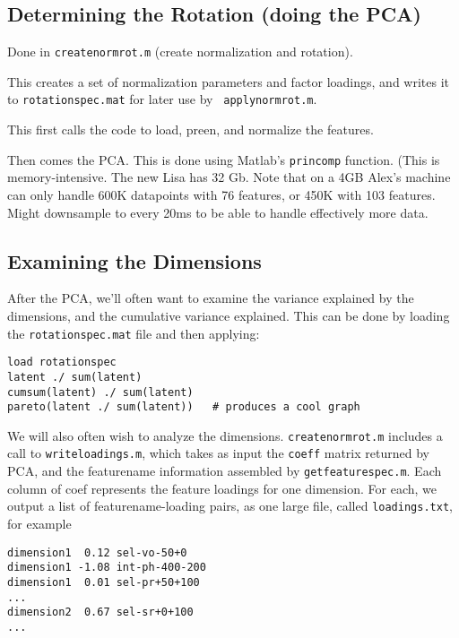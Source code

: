 \documentclass[11pt]{article}
\begin{document}
\subsection{Determining the Rotation (doing the PCA)}   \label{rotating}

Done in {\tt createnormrot.m} (create normalization and rotation).

This creates a set of normalization parameters and factor loadings,
and writes it to {\tt rotationspec.mat} for later use by {\tt
  applynormrot.m}.

This first calls the code to load, preen, and normalize the features.

Then comes the PCA.  This is done using Matlab's {\tt princomp}
function.  (This is memory-intensive.  The new Lisa has 32 Gb.  Note
that on a 4GB Alex's machine can only handle 600K datapoints with 76
features, or 450K with 103 features.  Might downsample to every 20ms
to be able to handle effectively more data.

\subsection{Examining the Dimensions}

After the PCA, we'll often want to examine the variance explained by
the dimensions, and the cumulative variance explained.  This can be
done by loading the {\tt rotationspec.mat} file and then applying:

\begin{verbatim}
load rotationspec
latent ./ sum(latent) 
cumsum(latent) ./ sum(latent) 
pareto(latent ./ sum(latent))   # produces a cool graph
\end{verbatim}


We will also often wish to analyze the dimensions.  
{\tt createnormrot.m} includes a call to  {\tt writeloadings.m}, which
takes as input the {\tt coeff} matrix returned by PCA, and the
featurename information assembled by {\tt getfeaturespec.m}.  Each
column of coef represents the feature loadings for one dimension.  For
each, we output a list of featurename-loading pairs, as one large
file, called {\tt loadings.txt}, for example 

\begin{verbatim}
dimension1  0.12 sel-vo-50+0
dimension1 -1.08 int-ph-400-200
dimension1  0.01 sel-pr+50+100
...
dimension2  0.67 sel-sr+0+100  
...
\end{verbatim}
\end{document}
